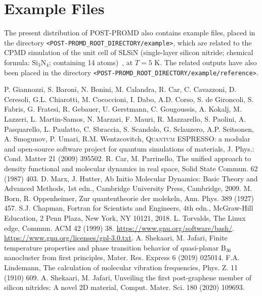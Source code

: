\documentclass[11pt]{article}
\def\qe{\textsc{Quantum ESPRESSO}}
\begin{document}
\section*{Example Files}
\begin{sloppypar}
The present distribution of POST-PROMD also contains example files, placed in the directory {\texttt{<POST-PROMD\_ROOT\_DIRECTORY/example>}}, which are related to the CPMD simulation of the unit cell of SLSiN (single-layer silicon nitride; chemical formula: Si$_3$N$_4$; containing 14 atoms)~\cite{sl}, at $T=5$ K. The related outputs have also been placed in the directory {\texttt{<POST-PROMD\_ROOT\_DIRECTORY/example/reference>}}.
\end{sloppypar}
\begin{thebibliography}{9}
P. Giannozzi, S. Baroni, N. Bonini, M. Calandra, R. Car, C. Cavazzoni, D. Ceresoli, G.L. Chiarotti, M. Cococcioni, I. Dabo, A.D. Corso, S. de Gironcoli, S. Fabris, G. Fratesi, R. Gebauer, U. Gerstmann, C. Gougoussis, A. Kokalj, M. Lazzeri, L. Martin-Samos, N. Marzari, F. Mauri, R. Mazzarello, S. Paolini, A. Pasquarello, L. Paulatto, C. Sbraccia, S. Scandolo, G. Sclauzero, A.P. Seitsonen, A. Smogunov, P. Umari, R.M. Wentzcovitch, \qe: a modular and open-source software project for quantum simulations of materials, J. Phys.: Cond. Matter 21 (2009) 395502.
R. Car, M. Parrinello, The uniﬁed approach to density functional and molecular dynamics in real space, Solid State Commun. 62 (1987)
403.
D. Marx, J. Hutter, Ab Initio Molecular Dynamics: Basic Theory and Advanced Methods, 1st edn., Cambridge University Press, Cambridge, 2009.
M. Born, R. Oppenheimer, Zur quantentheorie der molekeln, Ann. Phys. 389 (1927) 457.
S.J. Chapman, Fortran for Scientists and Engineers, 4th edn., McGraw-Hill Education, 2 Penn Plaza, New York, NY 10121, 2018.
L. Torvalds, The Linux edge, Commun. ACM 42
(1999) 38.
\url{https://www.gnu.org/software/bash/}.
\url{https://www.gnu.org/licenses/gpl-3.0.txt}.
A. Shekaari, M. Jafari, Finite temperature properties and phase transition behavior of quasi-planar B$_{36}$ nanocluster from first principles, Mater. Res. Express 6 (2019) 025014.
F.A. Lindemann, The calculation of molecular vibration frequencies, Phys. Z. 11 (1910) 609.
A. Shekaari, M. Jafari, Unveiling the first post-graphene member of silicon nitrides: A novel 2D material, Comput. Mater. Sci. 180 (2020) 109693.
\end{thebibliography}
\end{document}
